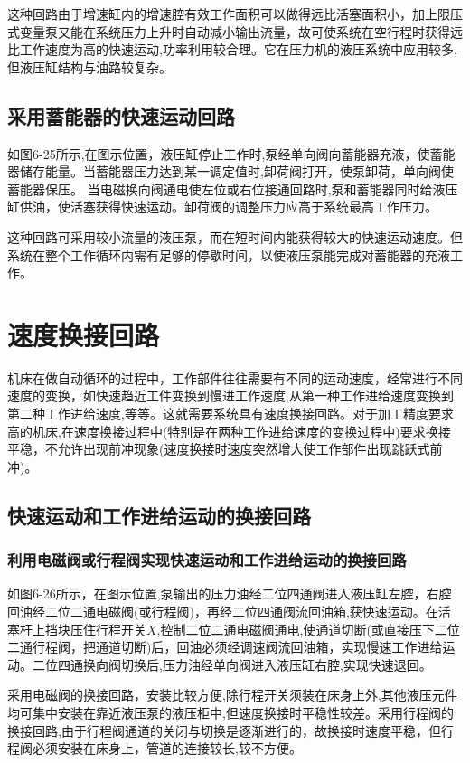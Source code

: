 这种回路由于增速缸内的增速腔有效工作面积可以做得远比活塞面积小，加上限压式变量泵又能在系统压力上升时自动减小输出流量，故可使系统在空行程时获得远比工作速度为高的快速运动,功率利用较合理。它在压力机的液压系统中应用较多,但液压缸结构与油路较复杂。


\subsection{采用蓄能器的快速运动回路}

如图6-25所示,在图示位置，液压缸停止工作时,泵经单向阀向蓄能器充液，使蓄能器储存能量。当蓄能器压力达到某一调定值时,卸荷阀打开，使泵卸荷，单向阀使蓄能器保压。 当电磁换向阀通电使左位或右位接通回路时,泵和蓄能器同时给液压缸供油，使活塞获得快速运动。卸荷阀的调整压力应高于系统最高工作压力。

这种回路可采用较小流量的液压泵，而在短时间内能获得较大的快速运动速度。但系统在整个工作循环内需有足够的停歇时间，以使液压泵能完成对蓄能器的充液工作。

\section{速度换接回路}

机床在做自动循环的过程中，工作部件往往需要有不同的运动速度，经常进行不同速度的变换，如快速趋近工件变换到慢进工作速度,从第一种工作进给速度变换到第二种工作进给速度,等等。这就需要系统具有速度换接回路。对于加工精度要求高的机床,在速度换接过程中(特别是在两种工作进给速度的变换过程中)要求换接平稳，不允许出现前冲现象(速度换接时速度突然增大使工作部件出现跳跃式前冲)。

\subsection{快速运动和工作进给运动的换接回路}

\subsubsection{利用电磁阀或行程阀实现快速运动和工作进给运动的换接回路}

如图6-26所示，在图示位置,泵输出的压力油经二位四通阀进入液压缸左腔，右腔回油经二位二通电磁阀(或行程阀)，再经二位四通阀流回油箱,获快速运动。在活塞杆上挡块压住行程开关$X$,控制二位二通电磁阀通电,使通道切断(或直接压下二位二通行程阀，把通道切断)后，回油必须经调速阀流回油箱，实现慢速工作进给运动。二位四通换向阀切换后,压力油经单向阀进入液压缸右腔,实现快速退回。

采用电磁阀的换接回路，安装比较方便,除行程开关须装在床身上外,其他液压元件均可集中安装在靠近液压泵的液压柜中,但速度换接时平稳性较差。采用行程阀的换接回路,由于行程阀通道的关闭与切换是逐渐进行的，故换接时速度平稳，但行程阀必须安装在床身上，管道的连接较长,较不方便。

